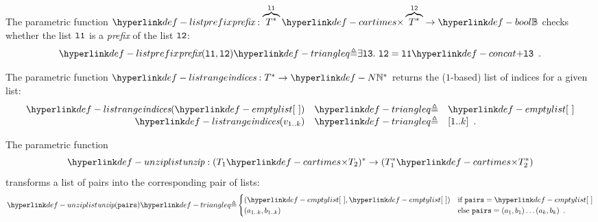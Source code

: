 \hypertarget{def-listprefix}{}
\begin{definition}
The parametric function $\listprefix : \overname{T^*}{\vlone} \cartimes \overname{T^*}{\vltwo} \rightarrow \Bool$ checks whether
the list $\texttt{l1}$ is a \emph{prefix} of the list $\texttt{l2}$:
\[
\listprefix(\vlone, \vltwo) \triangleq \exists \vlthree.\ \vltwo = \vlone \concat \vlthree \enspace.
\]
\end{definition}

\hypertarget{def-listrange}{}
\begin{definition}
The parametric function $\listrange : T^* \rightarrow \N^*$ returns the ($1$-based) list of indices for a given list:
\[
    \begin{array}{rcl}
        \listrange(\emptylist) &\triangleq& \emptylist\\
        \listrange(v_{1..k}) &\triangleq& [1..k] \enspace.
    \end{array}
\]
\end{definition}


\hypertarget{def-unziplist}{}
\begin{definition}
The parametric function
\[
\unziplist : (T_1 \cartimes T_2)^* \rightarrow (T_1^* \cartimes T_2^*)
\]
transforms a list of pairs into the corresponding pair of lists:
\[
  \unziplist(\pairs) \triangleq \begin{cases}
    (\emptylist, \emptylist)  & \text{if }\pairs = \emptylist\\
    (a_{1..k}, b_{1..k})      & \text{else }\pairs = (a_1,b_1) \ldots (a_k,b_k)  \enspace.
  \end{cases}
\]
\end{definition}

